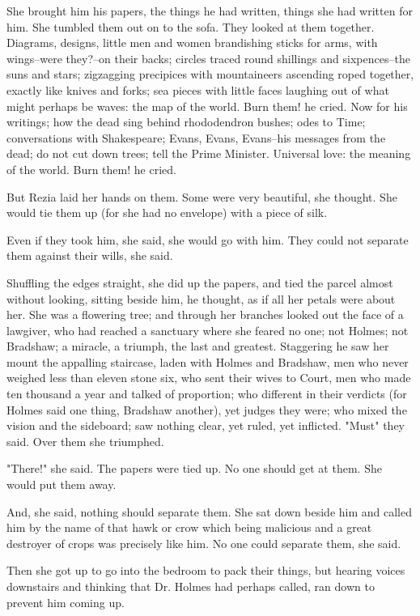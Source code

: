 \documentclass[lang=cn,10pt]{elegantbook}
\begin{document}
She brought him his papers, the things he had written, things she
had written for him.  She tumbled them out on to the sofa.  They
looked at them together.  Diagrams, designs, little men and women
brandishing sticks for arms, with wings--were they?--on their
backs; circles traced round shillings and sixpences--the suns and
stars; zigzagging precipices with mountaineers ascending roped
together, exactly like knives and forks; sea pieces with little
faces laughing out of what might perhaps be waves: the map of the
world.  Burn them! he cried.  Now for his writings; how the dead
sing behind rhododendron bushes; odes to Time; conversations with
Shakespeare; Evans, Evans, Evans--his messages from the dead; do
not cut down trees; tell the Prime Minister.  Universal love: the
meaning of the world.  Burn them! he cried.

But Rezia laid her hands on them.  Some were very beautiful, she
thought.  She would tie them up (for she had no envelope) with a
piece of silk.

Even if they took him, she said, she would go with him.  They could
not separate them against their wills, she said.

Shuffling the edges straight, she did up the papers, and tied the
parcel almost without looking, sitting beside him, he thought, as
if all her petals were about her.  She was a flowering tree; and
through her branches looked out the face of a lawgiver, who had
reached a sanctuary where she feared no one; not Holmes; not
Bradshaw; a miracle, a triumph, the last and greatest.  Staggering
he saw her mount the appalling staircase, laden with Holmes and
Bradshaw, men who never weighed less than eleven stone six, who
sent their wives to Court, men who made ten thousand a year and
talked of proportion; who different in their verdicts (for Holmes
said one thing, Bradshaw another), yet judges they were; who mixed
the vision and the sideboard; saw nothing clear, yet ruled, yet
inflicted.  "Must" they said.  Over them she triumphed.

"There!" she said.  The papers were tied up.  No one should get at
them.  She would put them away.

And, she said, nothing should separate them.  She sat down beside
him and called him by the name of that hawk or crow which being
malicious and a great destroyer of crops was precisely like him.
No one could separate them, she said.

Then she got up to go into the bedroom to pack their things, but
hearing voices downstairs and thinking that Dr. Holmes had perhaps
called, ran down to prevent him coming up.
\end{document}
